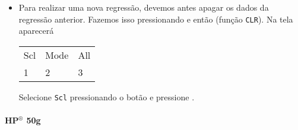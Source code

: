 \begin{itemize}
\item Para realizar uma nova regressão, devemos antes apagar os dados da regressão anterior. Fazemos isso pressionando  e então  (função \texttt{CLR}). Na tela aparecerá
\begin{center}
\begin{tabular}{p{2cm}p{2cm}p{2cm}}
Scl & Mode & All \\
1 & 2 & 3
\end{tabular}
\end{center}
%
Selecione \texttt{Scl} pressionando o botão  e pressione \keystroke{~=~}.
\end{itemize}

\paragraph{HP$^{\circledR}$ 50g}

